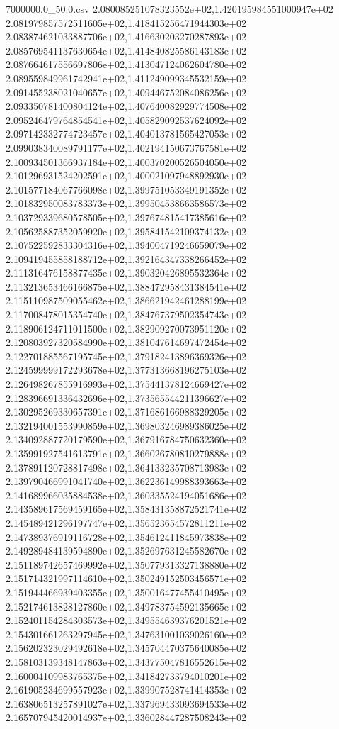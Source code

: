 \begin{filecontents*}{7000000.0_50.0.csv}
2.080085251078323552e+02,1.420195984551000947e+02
2.081979857572511605e+02,1.418415256471944303e+02
2.083874621033887706e+02,1.416630203270287893e+02
2.085769541137630654e+02,1.414840825586143183e+02
2.087664617556697806e+02,1.413047124062604780e+02
2.089559849961742941e+02,1.411249099345532159e+02
2.091455238021040657e+02,1.409446752084086256e+02
2.093350781400804124e+02,1.407640082929774508e+02
2.095246479764854541e+02,1.405829092537624092e+02
2.097142332774723457e+02,1.404013781565427053e+02
2.099038340089791177e+02,1.402194150673767581e+02
2.100934501366937184e+02,1.400370200526504050e+02
2.101296931524202591e+02,1.400021097948892930e+02
2.101577184067766098e+02,1.399751053349191352e+02
2.101832950083783373e+02,1.399504538663586573e+02
2.103729339680578505e+02,1.397674815417385616e+02
2.105625887352059920e+02,1.395841542109374132e+02
2.107522592833304316e+02,1.394004719246659079e+02
2.109419455858188712e+02,1.392164347338266452e+02
2.111316476158877435e+02,1.390320426895532364e+02
2.113213653466166875e+02,1.388472958431384541e+02
2.115110987509055462e+02,1.386621942461288199e+02
2.117008478015354740e+02,1.384767379502354743e+02
2.118906124711011500e+02,1.382909270073951120e+02
2.120803927320584990e+02,1.381047614697472454e+02
2.122701885567195745e+02,1.379182413896369326e+02
2.124599999172293678e+02,1.377313668196275103e+02
2.126498267855916993e+02,1.375441378124669427e+02
2.128396691336432696e+02,1.373565544211396627e+02
2.130295269330657391e+02,1.371686166988329205e+02
2.132194001553990859e+02,1.369803246989386025e+02
2.134092887720179590e+02,1.367916784750632360e+02
2.135991927541613791e+02,1.366026780810279888e+02
2.137891120728817498e+02,1.364133235708713983e+02
2.139790466991041740e+02,1.362236149988393663e+02
2.141689966035884538e+02,1.360335524194051686e+02
2.143589617569459165e+02,1.358431358872521741e+02
2.145489421296197747e+02,1.356523654572811211e+02
2.147389376919116728e+02,1.354612411845973838e+02
2.149289484139594890e+02,1.352697631245582670e+02
2.151189742657469992e+02,1.350779313327138880e+02
2.151714321997114610e+02,1.350249152503456571e+02
2.151944466939403355e+02,1.350016477455410495e+02
2.152174613828127860e+02,1.349783754592135665e+02
2.152401154284303573e+02,1.349554639376201521e+02
2.154301661263297945e+02,1.347631001039026160e+02
2.156202323029492618e+02,1.345704470375640085e+02
2.158103139348147863e+02,1.343775047816552615e+02
2.160004109983765375e+02,1.341842733794010201e+02
2.161905234699557923e+02,1.339907528741414353e+02
2.163806513257891027e+02,1.337969433093694533e+02
2.165707945420014937e+02,1.336028447287508243e+02

\end{filecontents*}
